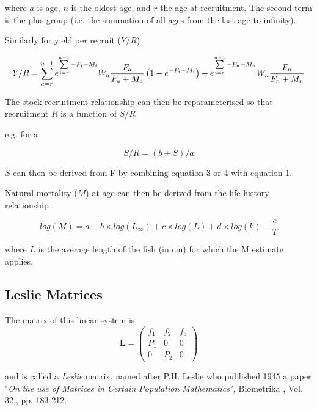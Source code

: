 \documentclass[]{article}
\begin{document}
\begin{itemize}
where $a$ is age, $n$ is the oldest age, and $r$ the age at recruitment. The second term is the plus-group (i.e. the summation of all ages from the  
last age to infinity).  
 
Similarly for yield per recruit ($Y/R$) 
 
\begin{equation} 
Y/R=\sum\limits_{a=r}^{n-1} {e^{\sum\limits_{i=r}^{a-1} {-F_i-M_i}}} W_a\frac{F_a}{F_a+M_a}\left(1-e^{-F_i-M_i} \right) + e^{\sum\limits_{i=r}^{n-1} {-F_n-M_n}} W_n\frac{F_n}{F_n+M_n}\\ 
\end{equation}  
 
The stock recruitment relationship can then be reparameterised so that recruitment $R$ is a function of $S/R$ 
 
e.g. for a \citet{beverton1956review}  
 
\begin{equation} 
S/R=(b+S)/a 	 
\end{equation}  
 
$S$ can then be derived from F by combining equation 3 or 4 with equation 1.  
 
Natural mortality ($M$) at-age can then be derived from the life history relationship \citet{gislason2008does}. 
 
\begin{equation} 
log(M) = a - b \times log(L_{\infty}) + c \times log(L) + d \times log(k) - \frac{e}{T} 
\end{equation}  
 
where $L$ is the average length of the fish (in cm) for which the M estimate applies. 
 
\subsection{Leslie Matrices}


The matrix of this linear system is 
\begin{equation*}
\mathbf{L}=%
\begin{pmatrix}
f_{1} & f_{2} & f_{3} \\ 
P_{1} & 0 & 0 \\ 
0 & P_{2} & 0%
\end{pmatrix}%
\end{equation*}

and is called a \textit{Leslie} matrix, named after P.H. Leslie who
published 1945 a paper "\textit{On the use of Matrices in Certain Population
Mathematics", }Biometrika , Vol. 32., pp. 183-212.


\end{itemize}
\end{document}
